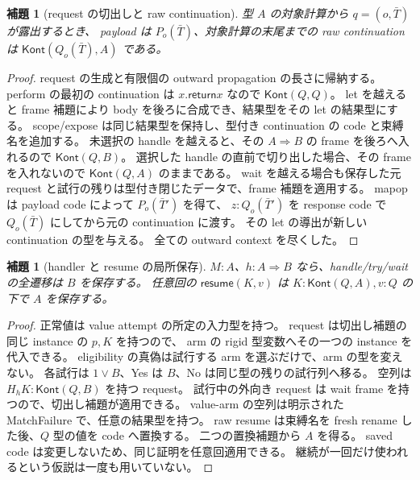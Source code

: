 \documentclass[11pt,a4paper]{article}
\newtheorem{lemma}[definition]{補題}
\newcommand{\Ret}{\mathsf{return}}
\newcommand{\Resume}{\mathsf{resume}}
\begin{document}
\begin{lemma}[request の切出しと raw continuation]
型 \(A\) の対象計算から \(q=(o,\bar T)\) が露出するとき、
payload は \(P_o(\bar T)\)、対象計算の末尾までの raw continuation は
\(\mathsf{Kont}(Q_o(\bar T),A)\) である。
\end{lemma}
\begin{proof}
request の生成と有限個の outward propagation の長さに帰納する。
perform の最初の continuation は \(x.\Ret x\) なので
\(\mathsf{Kont}(Q,Q)\)。
let を越えると frame 補題により body を後ろに合成でき、結果型をその let の結果型にする。
scope/expose は同じ結果型を保持し、型付き continuation の code と束縛名を追加する。
未選択の handle を越えると、その \(A\Rightarrow B\) の frame を後ろへ入れるので
\(\mathsf{Kont}(Q,B)\)。
選択した handle の直前で切り出した場合、その frame を入れないので
\(\mathsf{Kont}(Q,A)\) のままである。
wait を越える場合も保存した元 request と試行の残りは型付き閉じたデータで、frame 補題を適用する。
mapop は payload code によって \(P_o(\bar T')\) を得て、
\(z:Q_o(\bar T')\) を response code で \(Q_o(\bar T)\) にしてから元の continuation に渡す。
その let の導出が新しい continuation の型を与える。
全ての outward context を尽くした。
\end{proof}

\begin{lemma}[handler と resume の局所保存]
\(M:A\)、\(h:A\Rightarrow B\) なら、handle/try/wait の全遷移は \(B\) を保存する。
任意回の \(\Resume(K,v)\) は \(K:\mathsf{Kont}(Q,A),v:Q\) の下で \(A\) を保存する。
\end{lemma}
\begin{proof}
正常値は value attempt の所定の入力型を持つ。
request は切出し補題の同じ instance の \(p,K\) を持つので、
arm の rigid 型変数へその一つの instance を代入できる。
eligibility の真偽は試行する arm を選ぶだけで、arm の型を変えない。
各試行は \(1\vee B\)、Yes は \(B\)、No は同じ型の残りの試行列へ移る。
空列は \(H_hK:\mathsf{Kont}(Q,B)\) を持つ request。
試行中の外向き request は wait frame を持つので、切出し補題が適用できる。
value-arm の空列は明示された MatchFailure で、任意の結果型を持つ。
raw resume は束縛名を fresh rename した後、\(Q\) 型の値を code へ置換する。
二つの置換補題から \(A\) を得る。
saved code は変更しないため、同じ証明を任意回適用できる。
継続が一回だけ使われるという仮説は一度も用いていない。
\end{proof}
\end{document}
